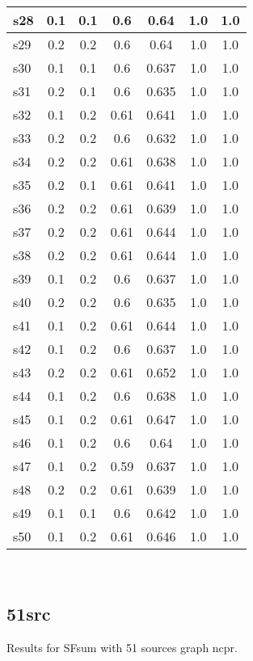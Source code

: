 \documentclass{article}
\begin{document}
\begin{tabular}{|l|c|c|c|c|c|c|}
\hline
s28 &0.1 & 0.1 & 0.6 & 0.64 & 1.0 & 1.0\\
\hline
s29 &0.2 & 0.2 & 0.6 & 0.64 & 1.0 & 1.0\\
\hline
s30 &0.1 & 0.1 & 0.6 & 0.637 & 1.0 & 1.0\\
\hline
s31 &0.2 & 0.1 & 0.6 & 0.635 & 1.0 & 1.0\\
\hline
s32 &0.1 & 0.2 & 0.61 & 0.641 & 1.0 & 1.0\\
\hline
s33 &0.2 & 0.2 & 0.6 & 0.632 & 1.0 & 1.0\\
\hline
s34 &0.2 & 0.2 & 0.61 & 0.638 & 1.0 & 1.0\\
\hline
s35 &0.2 & 0.1 & 0.61 & 0.641 & 1.0 & 1.0\\
\hline
s36 &0.2 & 0.2 & 0.61 & 0.639 & 1.0 & 1.0\\
\hline
s37 &0.2 & 0.2 & 0.61 & 0.644 & 1.0 & 1.0\\
\hline
s38 &0.2 & 0.2 & 0.61 & 0.644 & 1.0 & 1.0\\
\hline
s39 &0.1 & 0.2 & 0.6 & 0.637 & 1.0 & 1.0\\
\hline
s40 &0.2 & 0.2 & 0.6 & 0.635 & 1.0 & 1.0\\
\hline
s41 &0.1 & 0.2 & 0.61 & 0.644 & 1.0 & 1.0\\
\hline
s42 &0.1 & 0.2 & 0.6 & 0.637 & 1.0 & 1.0\\
\hline
s43 &0.2 & 0.2 & 0.61 & 0.652 & 1.0 & 1.0\\
\hline
s44 &0.1 & 0.2 & 0.6 & 0.638 & 1.0 & 1.0\\
\hline
s45 &0.1 & 0.2 & 0.61 & 0.647 & 1.0 & 1.0\\
\hline
s46 &0.1 & 0.2 & 0.6 & 0.64 & 1.0 & 1.0\\
\hline
s47 &0.1 & 0.2 & 0.59 & 0.637 & 1.0 & 1.0\\
\hline
s48 &0.2 & 0.2 & 0.61 & 0.639 & 1.0 & 1.0\\
\hline
s49 &0.1 & 0.1 & 0.6 & 0.642 & 1.0 & 1.0\\
\hline
s50 &0.1 & 0.2 & 0.61 & 0.646 & 1.0 & 1.0\\
\hline
\end{tabular}\\

\newpage

\subsection{51src}

\noindent Results for SFsum with 51 sources graph ncpr.
\end{document}
